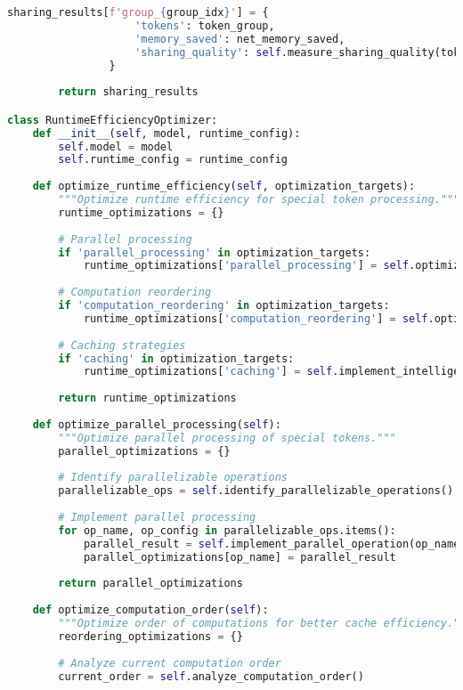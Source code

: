 \begin{lstlisting}[language=Python, caption=Comprehensive computational efficiency optimization framework]
                sharing_results[f'group_{group_idx}'] = {
                    'tokens': token_group,
                    'memory_saved': net_memory_saved,
                    'sharing_quality': self.measure_sharing_quality(token_group, shared_embedding)
                }
        
        return sharing_results

class RuntimeEfficiencyOptimizer:
    def __init__(self, model, runtime_config):
        self.model = model
        self.runtime_config = runtime_config
        
    def optimize_runtime_efficiency(self, optimization_targets):
        """Optimize runtime efficiency for special token processing."""
        runtime_optimizations = {}
        
        # Parallel processing
        if 'parallel_processing' in optimization_targets:
            runtime_optimizations['parallel_processing'] = self.optimize_parallel_processing()
        
        # Computation reordering
        if 'computation_reordering' in optimization_targets:
            runtime_optimizations['computation_reordering'] = self.optimize_computation_order()
        
        # Caching strategies
        if 'caching' in optimization_targets:
            runtime_optimizations['caching'] = self.implement_intelligent_caching()
        
        return runtime_optimizations
    
    def optimize_parallel_processing(self):
        """Optimize parallel processing of special tokens."""
        parallel_optimizations = {}
        
        # Identify parallelizable operations
        parallelizable_ops = self.identify_parallelizable_operations()
        
        # Implement parallel processing
        for op_name, op_config in parallelizable_ops.items():
            parallel_result = self.implement_parallel_operation(op_name, op_config)
            parallel_optimizations[op_name] = parallel_result
        
        return parallel_optimizations
    
    def optimize_computation_order(self):
        """Optimize order of computations for better cache efficiency."""
        reordering_optimizations = {}
        
        # Analyze current computation order
        current_order = self.analyze_computation_order()
        

\end{lstlisting}
